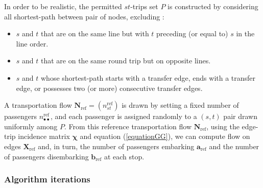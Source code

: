 \documentclass{bmcart}
\begin{document}
In order to be realistic, the permitted $st$-trips set $P$ is constructed by considering all shortest-path between pair of nodes, excluding :
\begin{itemize}
\item $s$ and $t$ that are on the same line but with $t$ preceding (or equal to) $s$ in the line order.
\item $s$ and $t$ that are on the same round trip but on opposite lines.
\item $s$ and $t$ whose shortest-path starts with a transfer edge, ends with a transfer edge, or possesses two (or more) consecutive transfer edges.
\end{itemize}

A transportation flow $\mathbf{N}_\text{ref} = (n^\text{ref}_{st})$ is drawn by setting a fixed number of passengers $n^\text{ref}_{\bullet \bullet}$, and each passenger is assigned randomly to a $(s, t)$ pair drawn uniformly among $P$. From this reference transportation flow $\mathbf{N}_\text{ref}$, using the edge-trip incidence matrix $\bm{\chi}$ and equation (\ref{equationGG}), we can compute flow on edges $\mathbf{X}_\text{ref}$ and, in turn, the number of passengers embarking $\mathbf{a}_\text{ref}$ and the number of passengers disembarking $\mathbf{b}_\text{ref}$ at each stop.


\subsubsection{Algorithm iterations}
\label{algorithm_iterations}
\end{document}
